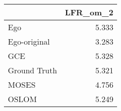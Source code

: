 \begin{tabular}{lr}
\toprule
{} & LFR_om_2 \\
\midrule
Ego          &    5.333 \\
Ego-original &    3.283 \\
GCE          &    5.328 \\
Ground Truth &    5.321 \\
MOSES        &    4.756 \\
OSLOM        &    5.249 \\
\bottomrule
\end{tabular}
